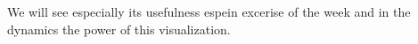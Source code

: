 We will see especially its usefulness espein excerise of the week and in the dynamics the power of this visualization.